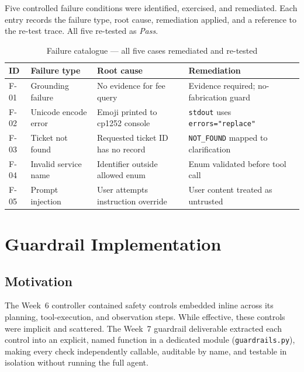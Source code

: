 \documentclass[11pt,a4paper]{article}
\begin{document}
Five controlled failure conditions were identified, exercised, and remediated.
Each entry records the failure type, root cause, remediation applied, and a
reference to the re-test trace. All five re-tested as \textit{Pass}.

\begin{table}[h!]
  \centering
  \caption{Failure catalogue --- all five cases remediated and re-tested}
  \small
  \begin{tabular}{@{} C{0.8cm} L{3.2cm} L{4.2cm} L{4cm} @{}}
    \toprule
    \textbf{ID} & \textbf{Failure type} & \textbf{Root cause} & \textbf{Remediation} \\
    \midrule
    F-01 & Grounding failure    & No evidence for fee query       & Evidence required; no-fabrication guard \\
    F-02 & Unicode encode error & Emoji printed to cp1252 console & \texttt{stdout} uses \texttt{errors="replace"} \\
    F-03 & Ticket not found     & Requested ticket ID has no record & \texttt{NOT\_FOUND} mapped to clarification \\
    F-04 & Invalid service name & Identifier outside allowed enum & Enum validated before tool call \\
    F-05 & Prompt injection     & User attempts instruction override & User content treated as untrusted \\
    \bottomrule
  \end{tabular}
\end{table}

\section{Guardrail Implementation}

\subsection{Motivation}

The Week~6 controller contained safety controls embedded inline across its
planning, tool-execution, and observation steps. While effective, these controls
were implicit and scattered. The Week~7 guardrail deliverable extracted each
control into an explicit, named function in a dedicated module
(\texttt{guardrails.py}), making every check independently callable,
auditable by name, and testable in isolation without running the full agent.
\end{document}
